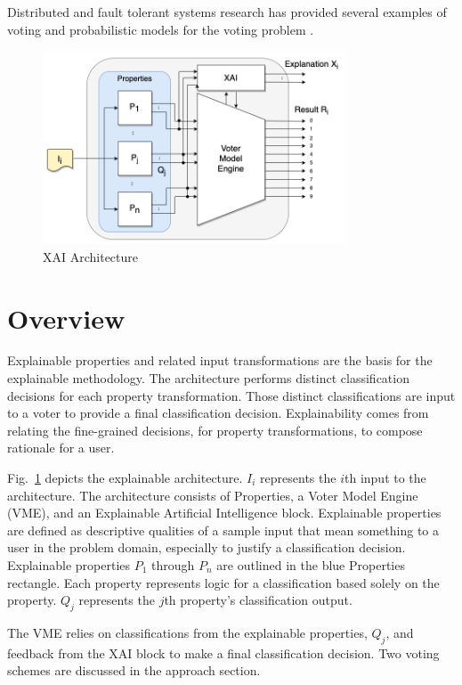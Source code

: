 \documentclass[conference]{IEEEtran}
\begin{document}
Distributed and fault tolerant systems research has provided several examples of
voting \cite{avizienis} and probabilistic models for the voting problem
\cite{blough}.

\begin{figure}[htbp]
\centerline{\includegraphics[width=90mm]{./images/voting_prop_nn_2.png}}
\caption{XAI Architecture}
\label{voting}
\end{figure}

\section{Overview}


Explainable properties and related input transformations are the basis for the
explainable methodology.  The architecture performs distinct classification
decisions for each property transformation.  Those distinct classifications are
input to a voter to provide a final classification decision.  Explainability
comes from relating the fine-grained decisions, for property transformations, to
compose rationale for a user.

Fig.~\ref{voting} depicts the explainable architecture.  $I_i$ represents the
$i$th input to the architecture.  The architecture consists of Properties, a
Voter Model Engine (VME),  and an Explainable Artificial Intelligence block.
Explainable properties are defined as descriptive qualities of a sample input
that mean something to a user in the problem domain, especially to justify a
classification decision.   Explainable properties $P_1$ through $P_n$ are
outlined in the blue Properties rectangle.  Each property represents logic for a
classification based solely on the property.   $Q_j$ represents the $j$th
property's classification output.

The VME relies on classifications from the explainable properties, $Q_j$, and
feedback from the XAI block to make a final classification decision.   Two
voting schemes are discussed in the approach section.
\end{document}
